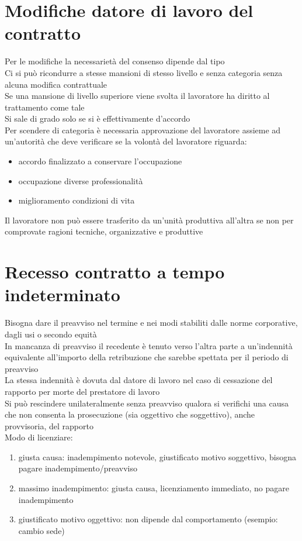 \documentclass[8pt,oneside,a4paper]{article}
\begin{document}
	\section{Modifiche datore di lavoro del contratto}
	Per le modifiche la necessarietà del consenso dipende dal tipo\\
	Ci si può ricondurre a stesse mansioni di stesso livello e senza categoria senza alcuna modifica contrattuale\\
	Se una mansione di livello superiore viene svolta il lavoratore ha diritto al trattamento come tale\\
	Si sale di grado solo se si è effettivamente d'accordo\\
	Per scendere di categoria è necessaria approvazione del lavoratore assieme ad un'autorità che deve verificare se la volontà del lavoratore riguarda:
	\begin{itemize}
		\item accordo finalizzato a conservare l'occupazione
		\item occupazione diverse professionalità
		\item miglioramento condizioni di vita
	\end{itemize}
	Il lavoratore non può essere trasferito da un'unità produttiva all'altra se non per comprovate ragioni tecniche, organizzative e produttive
	\section{Recesso contratto a tempo indeterminato}
	Bisogna dare il preavviso nel termine e nei modi stabiliti dalle norme corporative, dagli usi o secondo equità\\
	In mancanza di preavviso il recedente è tenuto verso l'altra parte a un'indennità equivalente all'importo della retribuzione che sarebbe spettata per il periodo di preavviso\\
	La stessa indennità è dovuta dal datore di lavoro nel caso di cessazione del rapporto per morte del prestatore di lavoro\\
	Si può rescindere unilateralmente senza preavviso qualora si verifichi una causa che non consenta la prosecuzione (sia oggettivo che soggettivo), anche provvisoria, del rapporto\\
	Modo di licenziare:
	\begin{enumerate}
		\item giusta causa: inadempimento notevole, giustificato motivo soggettivo, bisogna pagare inadempimento/preavviso
		\item massimo inadempimento: giusta causa, licenziamento immediato, no pagare inadempimento
		\item giustificato motivo oggettivo: non dipende dal comportamento (esempio: cambio sede)
	\end{enumerate}
\end{document}
